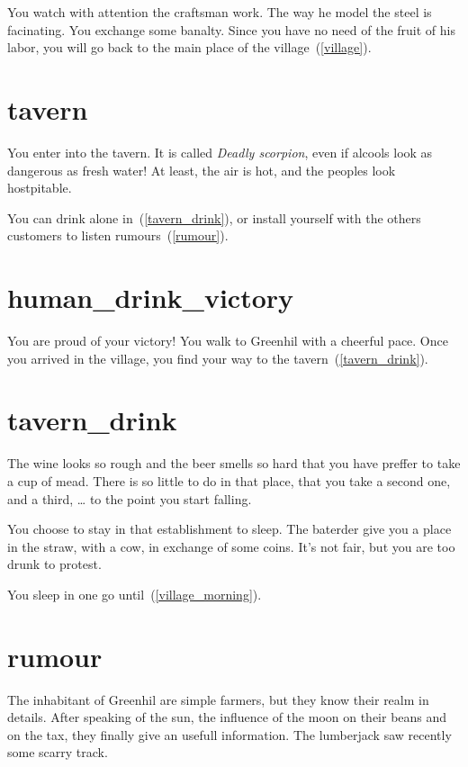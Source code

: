 You watch with attention the craftsman work. The way he model the steel is
facinating. You exchange some banalty. Since you have no need of the fruit
of his labor, you will go back to the main place of the village~(\ref{village}).

\section{tavern}

You enter into the tavern. It is called \textit{Deadly scorpion}, even if
alcools look as dangerous as fresh water! At least, the air is hot, and the
peoples look hostpitable.

You can drink alone in~(\ref{tavern_drink}), or install yourself with the others
customers to listen rumours~(\ref{rumour}).

\section{human_drink_victory}

You are proud of your victory! You walk to Greenhil with a cheerful pace. Once
you arrived in the village, you find your way to the tavern~(\ref{tavern_drink}).

\section{tavern_drink}

The wine looks so rough and the beer smells so hard that you have preffer to
take a cup of mead. There is so little to do in that place, that you take a
second one, and a third, … to the point you start falling.

You choose to stay in that establishment to sleep. The baterder give you a place in the
straw, with a cow, in exchange of some coins. It's not fair, but you are too drunk
to protest.

You sleep in one go until~(\ref{village_morning}).

\section{rumour}

The inhabitant of Greenhil are simple farmers, but they know their realm in
details. After speaking of the sun, the influence of the moon on their beans and
on the tax, they finally give an usefull information. The lumberjack saw
recently some scarry track.

